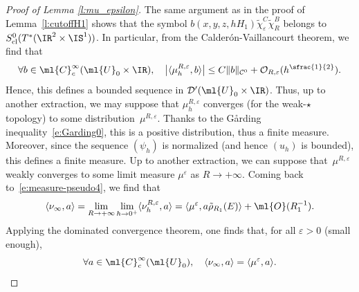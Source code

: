 \documentclass[JEP,XML,SOM,Unicode, NoEqCountersInSection,published]{cedram}
\theoremstyle{plain}
\theoremstyle{definition}
\theoremstyle{remark}
\begin{document}
\begin{proof}[Proof of Lemma \ref{l:mu_epsilon}]
The same argument as in the proof of Lemma~\ref{l:cutoffH1} shows that the symbol $b(x,y,z,hH_1)\tilde{\chi}_\varepsilon^C\tilde{\chi}_R^B$ belongs to $S^0_{\textup{cl}}(T^*(\IR^2\times\IS^1))$. In particular, from the Calderón-Vaillancourt theorem, we find that
\[
\forall b\in\ml{C}_c^{\infty}(\ml{U}_0\times\IR),\quad \bigl|\langle\mu_h^{R,\varepsilon},b\rangle\bigr|\leq C \|b\|_{\mathcal{C}^0}+\mathcal{O}_{R,\varepsilon}(h^{\sfrac{1}{2}}).
\]
Hence, this defines a bounded sequence in $\mathcal{D}^\prime(\ml{U}_0\times\IR)$. Thus, up to another extraction, we may suppose that $\mu_{h}^{R,\varepsilon}$ converges (for the weak-$\star$ topology) to some distribution~$\mu^{R,\varepsilon}$. Thanks to the G\aa rding inequality~\eqref{e:Garding0}, this is a positive distribution, thus a finite measure. Moreover, since the sequence $(\psi_h)$ is normalized (and hence $(u_h)$ is bounded), this defines a finite measure. Up to another extraction, we can suppose that~$\mu^{R,\varepsilon}$ weakly converges to some limit measure $\mu^{\varepsilon}$ as $R\to +\infty$. Coming back to~\eqref{e:measure-pseudo4}, we find that
\begin{equation}\label{e:comparison-measure0}\langle\nu_\infty,a\rangle=\lim_{R\to+\infty}\lim_{h\to 0^+}\langle\nu_h^{R,\varepsilon},a\rangle=\langle \mu^{\varepsilon}, a\tilde{\rho}_{R_1} (E)\rangle+\ml{O}(R_1^{-1}).
\end{equation}
Applying the dominated convergence theorem, one finds that, for all $\varepsilon>0$ (small enough),
\[
\forall a\in\ml{C}^{\infty}_c(\ml{U}_0),\quad\langle\nu_\infty,a\rangle=\langle\mu^{\varepsilon},a\rangle.\qedhere
\]
\end{proof}
\end{document}

